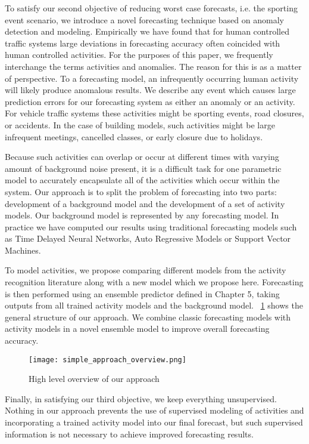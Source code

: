 To satisfy our second objective of reducing worst case forecasts, i.e. the sporting event scenario, we introduce a novel forecasting technique based on anomaly detection and modeling.  Empirically we have found that for human controlled traffic systems large deviations in forecasting accuracy often coincided with human controlled activities.  For the purposes of this paper, we frequently interchange the terms activities and anomalies.  The reason for this is as a matter of perspective.  To a forecasting model, an infrequently occurring human activity will likely produce anomalous results.  We describe any event which causes large prediction errors for our forecasting system as either an anomaly or an activity.  For vehicle traffic systems these activities might be sporting events, road closures, or accidents.  In the case of building models, such activities might be large infrequent meetings, cancelled classes, or early closure due to holidays.

Because such activities can overlap or occur at different times with varying amount of background noise present, it is a difficult task for one parametric model to accurately encapsulate all of the activities which occur within the system.  Our approach is to split the problem of forecasting into two parts: development of a background model and the development of a set of activity models.  Our background model is represented by any forecasting model.  In practice we have computed our results using traditional forecasting models such as Time Delayed Neural Networks, Auto Regressive Models or Support Vector Machines.   

To model activities, we propose comparing different models from the activity recognition literature along with a new model which we propose here.  Forecasting is then performed using an ensemble predictor defined in Chapter 5, taking outputs from all trained activity models and the background model.  ~\ref{fig:alg_overview} shows the general structure of our approach.  We combine classic forecasting models with activity models in a novel ensemble model to improve overall forecasting accuracy.

\begin{figure}
	\centering
	\texttt{[image: simple\_approach\_overview.png]}
	\caption{High level overview of our approach}
	\label{fig:alg_overview}
\end{figure}

Finally, in satisfying our third objective, we keep everything unsupervised.  Nothing in our approach prevents the use of supervised modeling of activities and incorporating a trained activity model into our final forecast, but such supervised information is not necessary to achieve improved forecasting results.


